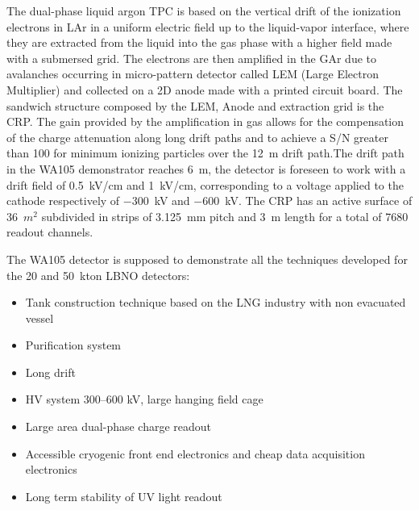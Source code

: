 The dual-phase liquid argon TPC is based on the vertical drift of the
ionization electrons in LAr in a uniform electric field up to the
liquid-vapor interface, where they are extracted from the liquid into
the gas phase with a higher field made with a submersed grid. The
electrons are then amplified in the GAr due to avalanches occurring
in micro-pattern detector called LEM (Large Electron Multiplier) and
collected on a 2D anode made with a printed circuit board. The
sandwich structure composed by the LEM, Anode and extraction
grid is the CRP. The gain provided by the
amplification in gas allows for the compensation of the charge
attenuation along long drift paths and to achieve a S/N greater than
100 for minimum ionizing particles over the 12~m drift path.The drift path
in the WA105 demonstrator reaches 6~m, the detector is foreseen to
work with a drift field of 0.5~kV/cm and 1~kV/cm, corresponding to a
voltage applied to the cathode respectively of $-$300~kV and $-$600~kV. The
CRP has an active surface of 36~$m^2$ subdivided in strips of 3.125~mm
pitch and 3~m length for a total of 7680 readout channels.

The WA105 detector is supposed to demonstrate all the techniques developed for the 20 and 50~kton LBNO detectors:
\begin{itemize}
\item{Tank construction technique based on the LNG industry with non evacuated vessel}
\item{Purification system}
\item{Long drift}
\item{HV system 300--600 kV, large hanging field cage}
\item{Large area dual-phase charge readout}
\item{Accessible cryogenic front end electronics and cheap data acquisition electronics}
\item{Long term stability of UV light readout}
\end{itemize}


